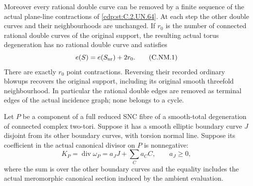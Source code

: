 \begin{proposition}
Moreover every rational double curve can be removed by a finite
sequence of the actual plane-line contractions of \ref{cdp:st:C.2.UN.64}.
At each step the other double curves and their neighbourhoods
are unchanged. If $r_0$ is the number of connected rational
double curves of the original support, the resulting actual
torus degeneration has no rational double curve and satisfies
\[
             e(S)=e(S_{\rm nr})+2r_0 .
\tag{C.NM.1}\label{cdp:eq:C.NM.1}
\]
There are exactly $r_0$ point contractions. Reversing their
recorded ordinary blowups recovers the original support,
including its original smooth threefold neighbourhood.
In particular the rational double edges are removed as terminal
edges of the actual incidence graph; none belongs to a cycle.
\end{proposition}

\begin{proposition}\label{cdp:st:C.2.UN.70}

Let \(P\) be a component of a full reduced SNC fibre of
a smooth-total degeneration of connected complex two-tori.
Suppose it has a smooth elliptic boundary curve \(J\)
disjoint from its other boundary curves, with torsion
normal line. Suppose its coefficient in the actual
canonical divisor on \(P\) is nonnegative:
\[
 K_P=\operatorname{div}\omega_P
       =a_JJ+\sum_C a_C C,\qquad a_J\ge0 ,
 \tag{C.NP.1}\label{cdp:eq:C.NP.1}
\]
where the sum is over the other boundary curves and
the equality includes the actual meromorphic canonical
section induced by the ambient evaluation.


\end{proposition}
